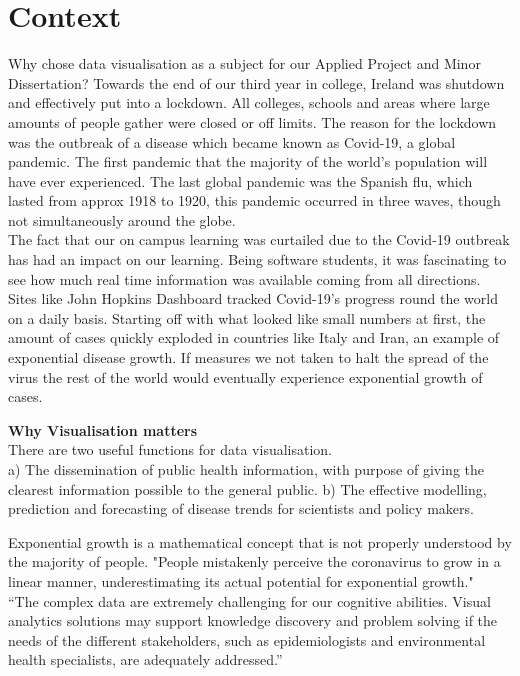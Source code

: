 \section{Context}
Why chose data visualisation as a subject for our Applied Project and Minor Dissertation? Towards the end of our third year in college, Ireland was shutdown and effectively put into a lockdown. All colleges, schools and areas where large amounts of people gather were closed or off limits. The reason for the lockdown was the outbreak of a disease which became known as Covid-19, a global pandemic. The first pandemic that the majority of the world's population will have ever experienced. The last global pandemic was the Spanish flu, which lasted from approx 1918 to 1920, this pandemic occurred in three waves, though not simultaneously around the globe.\cite{Spanishflu}\\
The fact that our on campus learning was curtailed due to the Covid-19 outbreak has had an impact on our learning. Being software students, it was fascinating to see how much real time information was available coming from all directions. Sites like John Hopkins Dashboard tracked Covid-19's progress round the world on a daily basis. Starting off with what looked like small numbers at first, the amount of cases quickly exploded in countries like Italy and Iran, an example of exponential disease growth. If measures we not taken to halt the spread of the virus the rest of the world would eventually experience exponential growth of cases.\\

\vspace{5mm}

\textbf{Why Visualisation matters}\\
There are two useful functions for data visualisation.\\
a) The dissemination of public health information, with purpose of giving the clearest information possible to the general public.
b) The effective modelling, prediction and forecasting of disease trends for scientists and policy makers.

Exponential growth is a mathematical concept that is not properly understood by the majority of people.
"People mistakenly perceive the coronavirus to grow in a linear manner, underestimating its actual potential for exponential growth."\cite{lammers2020correcting}\\
\vspace{5mm}
“The complex data are extremely challenging for our cognitive abilities. Visual analytics solutions may support knowledge discovery and problem solving if the needs of the different stakeholders, such as epidemiologists and environmental health specialists, are adequately addressed.”\cite{preim2020survey}

